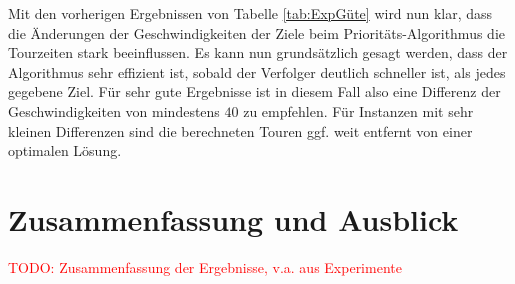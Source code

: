 \documentclass[german,version-2019-11]{uzl-thesis}
\begin{document}
\begin{table}[htpb]
\centering
{}
\caption{Ziele mit gleichen Geschwindigkeiten im Prioritäts-Algorithmus}
\label{tab:ExpPrio}
\end{table}\noindent

Mit den vorherigen Ergebnissen von Tabelle \ref{tab:ExpGüte} wird nun klar, dass die Änderungen der Geschwindigkeiten der Ziele beim Prioritäts-Algorithmus die Tourzeiten stark beeinflussen. Es kann nun grundsätzlich gesagt werden, dass der Algorithmus sehr effizient ist, sobald der Verfolger deutlich schneller ist, als jedes gegebene Ziel. Für sehr gute Ergebnisse ist in diesem Fall also eine Differenz der Geschwindigkeiten von mindestens $40$ zu empfehlen. Für Instanzen mit sehr kleinen Differenzen sind die berechneten Touren ggf. weit entfernt von einer optimalen Lösung. 

\chapter{Zusammenfassung und Ausblick}
\textcolor{red}{TODO: Zusammenfassung der Ergebnisse, v.a. aus Experimente} 
\end{document}
